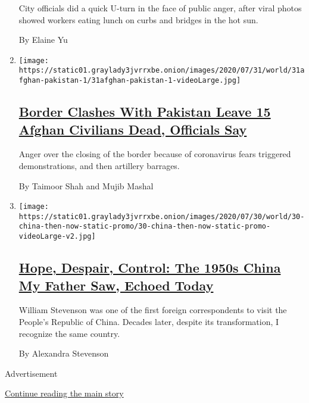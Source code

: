 \begin{enumerate}
  City officials did a quick U-turn in the face of public anger, after
  viral photos showed workers eating lunch on curbs and bridges in the
  hot sun.

  By Elaine Yu
\item
  \texttt{[image: https://static01.graylady3jvrrxbe.onion/images/2020/07/31/world/31afghan-pakistan-1/31afghan-pakistan-1-videoLarge.jpg]}

  \hypertarget{border-clashes-with-pakistan-leave-15-afghan-civilians-dead-officials-say}{%
  \subsection{\texorpdfstring{\href{/2020/07/31/world/asia/afghanistan-pakistan-border.html}{Border
  Clashes With Pakistan Leave 15 Afghan Civilians Dead, Officials
  Say}}{Border Clashes With Pakistan Leave 15 Afghan Civilians Dead, Officials Say}}\label{border-clashes-with-pakistan-leave-15-afghan-civilians-dead-officials-say}}

  Anger over the closing of the border because of coronavirus fears
  triggered demonstrations, and then artillery barrages.

  By Taimoor Shah and Mujib Mashal
\item
  \texttt{[image: https://static01.graylady3jvrrxbe.onion/images/2020/07/30/world/30-china-then-now-static-promo/30-china-then-now-static-promo-videoLarge-v2.jpg]}

  \hypertarget{hope-despair-control-the-1950s-china-my-father-saw-echoed-today}{%
  \subsection{\texorpdfstring{\href{/interactive/2020/07/30/world/asia/china-1950s-echoed-today.html}{Hope,
  Despair, Control: The 1950s China My Father Saw, Echoed
  Today}}{Hope, Despair, Control: The 1950s China My Father Saw, Echoed Today}}\label{hope-despair-control-the-1950s-china-my-father-saw-echoed-today}}

  William Stevenson was one of the first foreign correspondents to visit
  the People's Republic of China. Decades later, despite its
  transformation, I recognize the same country.

  By Alexandra Stevenson
\end{enumerate}

Advertisement

\protect\hyperlink{after-mid1}{Continue reading the main story}

